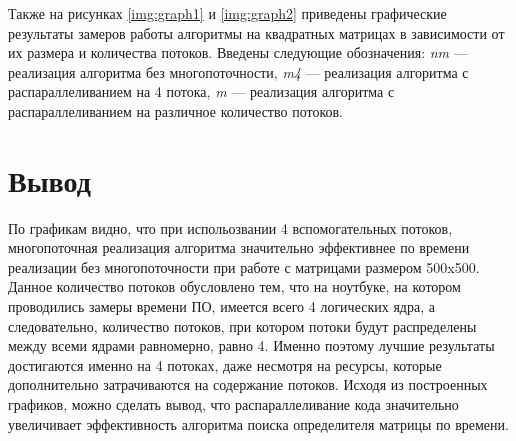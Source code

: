 Также на рисунках \ref{img:graph1} и \ref{img:graph2} приведены графические результаты замеров работы алгоритмы на квадратных матрицах в зависимости от их размера и количества потоков. Введены следующие обозначения: \textit{nm} --- реализация алгоритма без многопоточности, \textit{m4} --- реализация алгоритма с распараллеливанием на 4 потока, \textit{m} --- реализация алгоритма с распараллеливанием на различное количество потоков.
\FloatBarrier
{}
\FloatBarrier
\FloatBarrier
{}
\FloatBarrier

\section*{Вывод}
По графикам видно, что при испольозвании 4 вспомогательных потоков, многопоточная реализация алгоритма  значительно эффективнее по времени реализации без многопоточности при работе с матрицами размером 500x500. Данное количество потоков обусловлено тем, что на ноутбуке, на котором проводились замеры времени ПО, имеется всего 4 логических ядра, а следовательно, количество потоков, при котором потоки будут распределены между всеми ядрами равномерно, равно 4. Именно поэтому лучшие результаты достигаются именно на 4 потоках, даже несмотря на ресурсы, которые дополнительно затрачиваются на содержание потоков. Исходя из построенных графиков, можно сделать вывод, что распараллеливание кода значительно увеличивает эффективность алгоритма поиска определителя матрицы по времени.